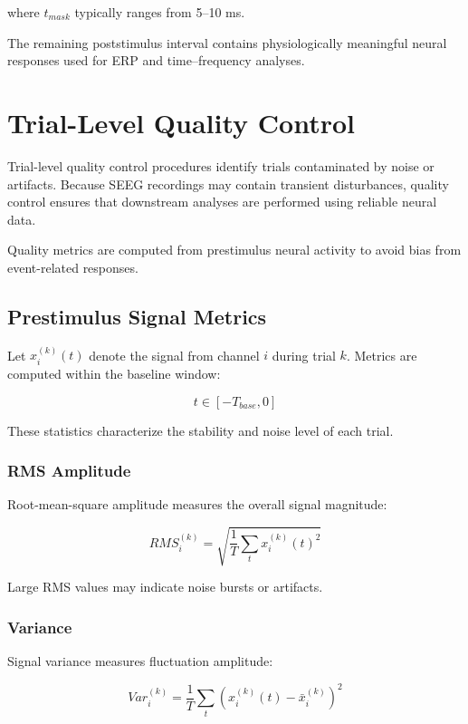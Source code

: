 \documentclass[11pt]{report}
\begin{document}
where $t_{mask}$ typically ranges from 5--10 ms.

The remaining poststimulus interval contains physiologically meaningful
neural responses used for ERP and time--frequency analyses.

\chapter{Trial-Level Quality Control}

Trial-level quality control procedures identify trials contaminated by
noise or artifacts. Because SEEG recordings may contain transient
disturbances, quality control ensures that downstream analyses are
performed using reliable neural data.

Quality metrics are computed from prestimulus neural activity to
avoid bias from event-related responses.

\section{Prestimulus Signal Metrics}

Let $x_i^{(k)}(t)$ denote the signal from channel $i$ during trial $k$.
Metrics are computed within the baseline window:

\begin{equation}
t \in [-T_{base},0]
\end{equation}

These statistics characterize the stability and noise level of
each trial.

\subsection{RMS Amplitude}

Root-mean-square amplitude measures the overall signal magnitude:

\begin{equation}
RMS_i^{(k)} =
\sqrt{
\frac{1}{T}
\sum_{t}
x_i^{(k)}(t)^2
}
\end{equation}

Large RMS values may indicate noise bursts or artifacts.

\subsection{Variance}

Signal variance measures fluctuation amplitude:

\begin{equation}
Var_i^{(k)} =
\frac{1}{T}
\sum_{t}
(x_i^{(k)}(t) - \bar{x}_i^{(k)})^2
\end{equation}
\end{document}
